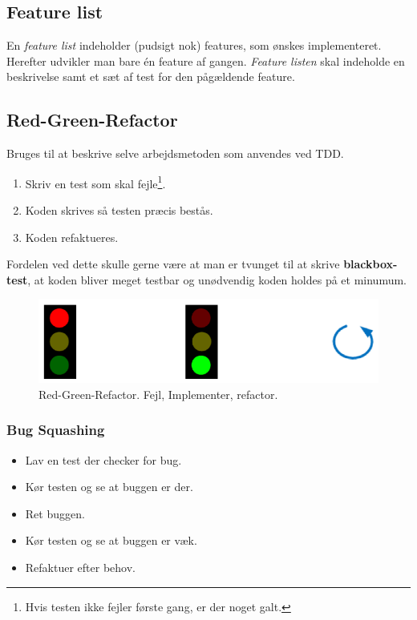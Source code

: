 \subsection{Feature list}
En \textit{feature list} indeholder (pudsigt nok) features, som ønskes implementeret. Herefter udvikler man bare én feature af gangen. \textit{Feature listen} skal indeholde en beskrivelse samt et sæt af test for den pågældende feature.

\subsection{Red-Green-Refactor}
Bruges til at beskrive selve arbejdsmetoden som anvendes ved TDD.

\begin{enumerate}
	\item Skriv en test som skal fejle\footnote{Hvis testen ikke fejler første gang, er der noget galt.}.
	\item Koden skrives så testen præcis bestås.
	\item Koden refaktueres.
\end{enumerate}

Fordelen ved dette skulle gerne være at man er tvunget til at skrive \textbf{blackbox-test}, at koden bliver meget testbar og unødvendig koden holdes på et minumum.

\begin{figure}[H]
\centering
\includegraphics[width=0.7\linewidth]{figs/redgreen}
\caption{Red-Green-Refactor. Fejl, Implementer, refactor.}
\label{fig:redgreen}
\end{figure}

\subsubsection{Bug Squashing}

\begin{itemize}
	\item Lav en test der checker for bug.
	\item Kør testen og se at buggen er der.
	\item Ret buggen.
	\item Kør testen og se at buggen er væk.
	\item Refaktuer efter behov.
\end{itemize}

